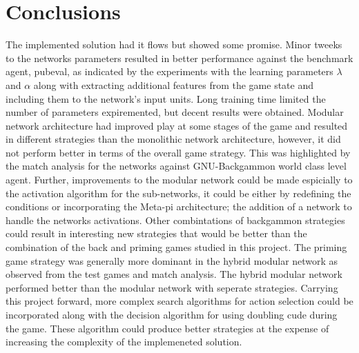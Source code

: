 \documentclass[12pt,a4paper]{article}
\begin{document}
\section{Conclusions}
The implemented solution had it flows but showed some promise. Minor tweeks to the networks parameters resulted in better performance against the benchmark agent, pubeval, as indicated by the experiments with the learning parameters $\lambda$ and $\alpha$ along with extracting additional features from the game state and including them to the network's input units. Long training time limited the number of parameters expiremented, but decent results were obtained. Modular network architecture had improved play at some stages of the game and resulted in different strategies than the monolithic network architecture, however, it did not perform better in terms of the overall game strategy. This was highlighted by the match analysis for the networks against GNU-Backgammon world class level agent. Further, improvements to the modular network could be made espicially to the activation algorithm for the sub-networks, it could be either by redefining the conditions or incorporating the Meta-pi architecture; the addition of a network to handle the networks activations. Other combintations of backgammon strategies could result in interesting new strategies that would be better than the combination of the back and priming games studied in this project. The priming game strategy was generally more dominant in the hybrid modular network as observed from the test games and match analysis. The hybrid modular network performed better than the modular network with seperate strategies. Carrying this project forward, more complex search algorithms for action selection could be incorporated along with the decision algorithm for using doubling cude during the game. These algorithm could produce better strategies at the expense of increasing the complexity of the implemeneted solution. 



\end{document}
